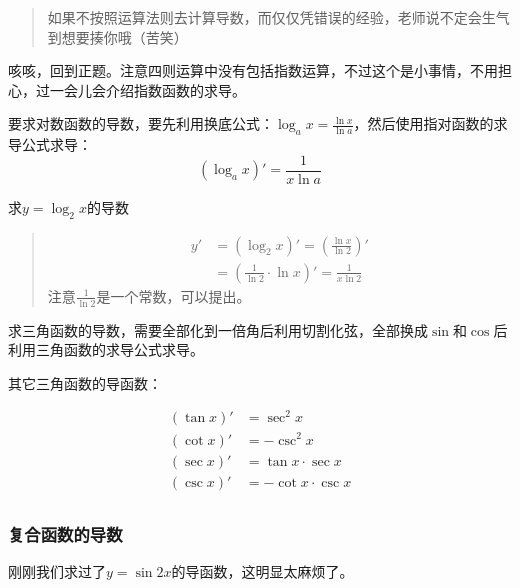 \begin{quote}
	如果不按照运算法则去计算导数，而仅仅凭错误的经验，老师说不定会生气到想要揍你哦（苦笑）
\end{quote}

咳咳，回到正题。注意四则运算中没有包括指数运算，不过这个是小事情，不用担心，过一会儿会介绍指数函数的求导。

\noindent\dotfill

要求对数函数的导数，要先利用换底公式：$\log_ax=\frac{\ln x}{\ln a}$，然后使用指对函数的求导公式求导：
\[(\log_ax)'=\frac{1}{x\ln a}\]

\begin{example}
	求$y=\log_2x$的导数

	\begin{quote}
		\[\begin{aligned}
			y'&=(\log_2x)'=(\frac{\ln x}{\ln2})' \\
			  &=(\frac{1}{\ln2}\cdot\ln x)'=\frac{1}{x\ln2}
		\end{aligned}\]
		注意$\frac{1}{\ln2}$是一个常数，可以提出。
	\end{quote}
\end{example}

\noindent\dotfill

求三角函数的导数，需要全部化到一倍角后利用切割化弦，全部换成$\sin$和$\cos$后利用三角函数的求导公式求导。

其它三角函数的导函数：

\[
	\begin{aligned}
		(\tan x)'&=\sec^2x \\
		(\cot x)'&=-\csc^2x \\
		(\sec x)'&=\tan x\cdot\sec x \\
		(\csc x)'&=-\cot x\cdot\csc x \\
	\end{aligned}
\]

\subsubsection{复合函数的导数}
刚刚我们求过了$y=\sin2x$的导函数，这明显太麻烦了。
